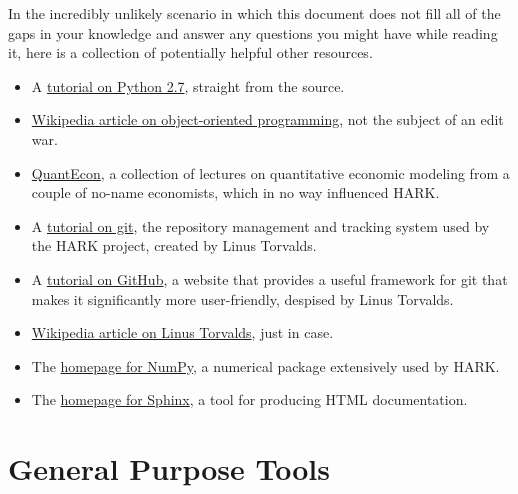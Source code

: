\documentclass[12pt,titlepage,letterpaper]{econtex}
\begin{document}
In the incredibly unlikely scenario in which this document does not fill all of the gaps in your knowledge and answer any questions you might have while reading it, here is a collection of potentially helpful other resources.

\begin{itemize}

\item A \href{https://docs.python.org/2.7/tutorial/}{tutorial on Python 2.7}, straight from the source.

\item \href{https://en.wikipedia.org/wiki/Object-oriented_programming}{Wikipedia article on object-oriented programming}, not the subject of an edit war.

\item \href{http://quant-econ.net/}{QuantEcon}, a collection of lectures on quantitative economic modeling from a couple of no-name economists, which in no way influenced HARK.

\item A \href{https://www.atlassian.com/git/tutorials/}{tutorial on git}, the repository management and tracking system used by the HARK project, created by Linus Torvalds.

\item A \href{https://guides.github.com/activities/hello-world/}{tutorial on GitHub}, a website that provides a useful framework for git that makes it significantly more user-friendly, despised by Linus Torvalds.

\item \href{https://en.wikipedia.org/wiki/Linus_Torvalds}{Wikipedia article on Linus Torvalds}, just in case.

\item The \href{http://www.numpy.org/}{homepage for NumPy}, a numerical package extensively used by HARK.

\item The \href{http://www.sphinx-doc.org/}{homepage for Sphinx}, a tool for producing HTML documentation.

\end{itemize}

\newpage

\section{General Purpose Tools}\label{sec:GeneralPurposeTools}
\end{document}
